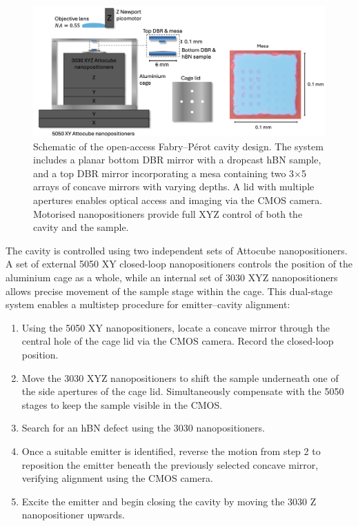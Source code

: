 \begin{figure}[h]
    \centering
    \includegraphics[width=0.9\linewidth]{Figures/CavityDesign1.png}
    \caption{Schematic of the open-access Fabry–Pérot cavity design. The system includes a planar bottom DBR mirror with a dropcast hBN sample, and a top DBR mirror incorporating a mesa containing two 3$\times$5 arrays of concave mirrors with varying depths. A lid with multiple apertures enables optical access and imaging via the CMOS camera. Motorised nanopositioners provide full XYZ control of both the cavity and the sample.}
    \label{fig:cavity-design1}
\end{figure}

The cavity is controlled using two independent sets of Attocube nanopositioners. A set of external 5050 XY closed-loop nanopositioners controls the position of the aluminium cage as a whole, while an internal set of 3030 XYZ nanopositioners allows precise movement of the sample stage within the cage. This dual-stage system enables a multistep procedure for emitter–cavity alignment:

\begin{enumerate}
    \item Using the 5050 XY nanopositioners, locate a concave mirror through the central hole of the cage lid via the CMOS camera. Record the closed-loop position.
    \item Move the 3030 XYZ nanopositioners to shift the sample underneath one of the side apertures of the cage lid. Simultaneously compensate with the 5050 stages to keep the sample visible in the CMOS.
    \item Search for an hBN defect using the 3030 nanopositioners.
    \item Once a suitable emitter is identified, reverse the motion from step 2 to reposition the emitter beneath the previously selected concave mirror, verifying alignment using the CMOS camera.
    \item Excite the emitter and begin closing the cavity by moving the 3030 Z nanopositioner upwards.
\end{enumerate}

